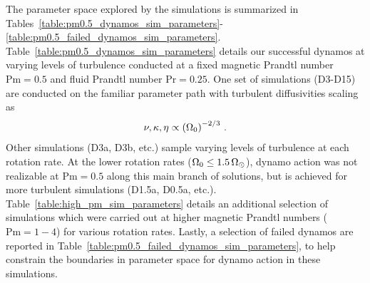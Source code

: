 \clearpage
The parameter space explored by the simulations is summarized in
Tables~\ref{table:pm0.5_dynamos_sim_parameters}-\ref{table:pm0.5_failed_dynamos_sim_parameters}.
Table~\ref{table:pm0.5_dynamos_sim_parameters}
details our successful dynamos at varying levels of
turbulence conducted at a fixed magnetic Prandtl number
$\mathrm{Pm}=0.5$ and fluid Prandtl number $\mathrm{Pr}=0.25$.  
One set of simulations (D3-D15) are
conducted on the familiar parameter path with turbulent diffusivities
scaling as
\begin{equation}
  \nu, \kappa, \eta \propto \left(\Omega_0\right)^{-2/3}\thinspace.
  \label{eq:diffusivity scaling}
\end{equation}
Other simulations (D3a, D3b, etc.) sample varying levels of turbulence
at each rotation rate.  At the lower rotation rates 
($\Omega_0 \leq 1.5\thinspace\Omega_\odot$), dynamo action was not
realizable at $\mathrm{Pm}=0.5$ along this main branch of solutions,
but is achieved for more turbulent simulations (D1.5a, D0.5a, etc.).  
Table~\ref{table:high_pm_sim_parameters} details an additional
selection of simulations which were carried out at higher  
magnetic Prandtl numbers ($\mathrm{Pm}=1-4$) for various rotation rates.
Lastly, a selection of failed dynamos are reported in
Table~\ref{table:pm0.5_failed_dynamos_sim_parameters}, to help constrain the
boundaries in parameter space for dynamo action in these simulations.



